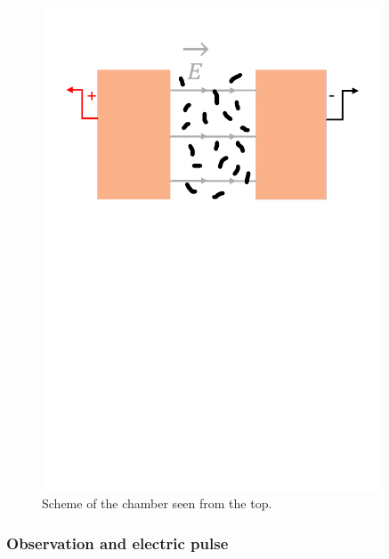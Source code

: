 \begin{minipage}{0.49\textwidth}
    \begin{figure}[H]
    \centering 
    \captionsetup{width=0.9\linewidth, justification=centering}
    \includegraphics[width=0.9\textwidth]{Figures/Chamber_top.pdf}
    \caption{Scheme of the chamber seen from the top.}
    \label{fig:Chamber_top}
    \end{figure}
\end{minipage}

\subsubsection{Observation and electric pulse}

